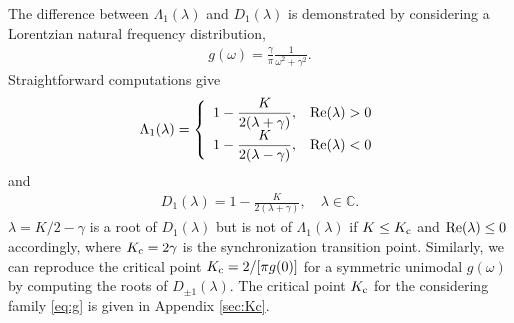 The difference between $\Lambda_{1}(\lambda)$ and $D_{1}(\lambda)$
is demonstrated by considering a Lorentzian natural frequency distribution,
\begin{align}
  g(\omega) = \frac{\gamma}{\pi} \frac{1}{\omega^{2}+\gamma^{2}}.
\end{align}
Straightforward computations give
\begin{align}
  \Lambda_{1}(\lambda) = \left\{
    \begin{array}{ll}
      \displaystyle{1 - \frac{K}{2(\lambda+\gamma)}}, & {\rm Re}(\lambda)>0 \\
      \displaystyle{1 - \frac{K}{2(\lambda-\gamma)}}, & {\rm Re}(\lambda)<0 \\
    \end{array}
  \right.
\end{align}
and
\begin{align}
  D_{1}(\lambda) = 1 - \frac{K}{2(\lambda+\gamma)}, \quad \lambda\in\mathbb{C}.
\end{align}
$\lambda=K/2-\gamma$ is a root of $D_{1}(\lambda)$
but is not of $\Lambda_{1}(\lambda)$ if $K\leq K_{\rm c}$
and ${\rm Re}(\lambda)\leq 0$ accordingly,
where $K_{\rm c}=2\gamma$ is the synchronization transition point.
Similarly, we can reproduce the critical point $K_{\rm c}=2/[\pi g(0)]$
for a symmetric unimodal $g(\omega)$
by computing the roots of $D_{\pm 1}(\lambda)$.
The critical point $K_{\rm c}$ for the considering family \eqref{eq:g}
is given in Appendix \ref{sec:Kc}.





